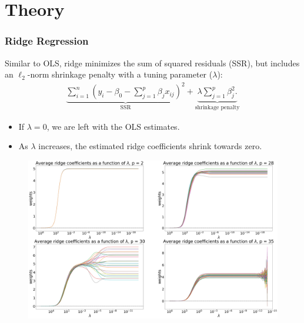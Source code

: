 \section{Theory}
\begin{frame}[fragile]
    \frametitle{Ridge Regression}
    Similar to OLS, ridge minimizes the sum of squared residuals (SSR), but includes an $\ell_2$-norm shrinkage penalty with a tuning parameter ($\lambda$):
    \begin{align}
    \label{eqn:eqn1}
    \underbrace{\sum_{i=1}^{n}\left(y_{i}-\beta_{0}-\sum_{j=1}^{p} \beta_{j} x_{i j}\right)^{2}}_\text{SSR} + \underbrace{\lambda\sum_{j=1}^{p}\beta_{j}^{2}.}_\text{shrinkage penalty}
    \end{align}
    \begin{itemize}
        \item If $\lambda=0$, we are left with the OLS estimates.
        \item As $\lambda$ increases, the estimated ridge coefficients shrink towards zero.
    \end{itemize}
\end{frame}
\begin{frame}[fragile]
    \begin{figure}[b]
        \includegraphics[scale=0.14]{Img/average_ridge_plot_betas.png}
        \centering
    \end{figure}
\end{frame}
